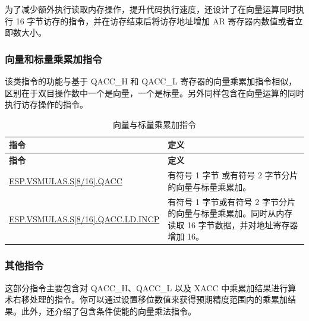 \documentclass[main\_\_CN.tex]{subfiles}
\begin{document}
为了减少额外执行读取内存操作，提升代码执行速度，还设计了在向量运算同时执行 16 字节访存的指令，并在访存结束后将访存地址增加 AR 寄存器内数值或者立即数大小。




\subsubsection{向量和标量乘累加指令}

该类指令的功能与基于 QACC\_H 和 QACC\_L 寄存器的向量乘累加指令相似，区别在于双目操作数中一个是向量，一个是标量。另外同样包含在向量运算的同时执行访存操作的指令。

\begin{longtable}[c]{|l|m{10cm}|}
    \caption{向量与标量乘累加指令}
    \label{tab:pie-vector-scalar-instructions}\\
    \hline
    \rowcolor{lightgray}
    \textbf{指令} & \textbf{定义} \\\hline
    \endfirsthead
    \rowcolor{lightgray}
    \textbf{指令} & \textbf{定义} \\\hline
    \endhead
    \endfoot

    \hyperref[instruction:ESPVSMULASS8QACC]{ESP.VSMULAS.S[8/16].QACC} & 有符号 1 字节 或有符号 2 字节分片的向量与标量乘累加。
    \\\hline
    \hyperref[instruction:ESPVSMULASS8QACCLDINCP]{ESP.VSMULAS.S[8/16].QACC.LD.INCP} & 有符号 1 字节或有符号 2 字节分片的向量与标量乘累加。同时从内存读取 16 字节数据，并对地址寄存器增加 16。
    \\\hline
\end{longtable}


\subsubsection{其他指令}

这部分指令主要包含对 QACC\_H、QACC\_L 以及 XACC 中乘累加结果进行算术右移处理的指令。你可以通过设置移位数值来获得预期精度范围内的乘累加结果。此外，还介绍了包含条件使能的向量乘法指令。
\end{document}
